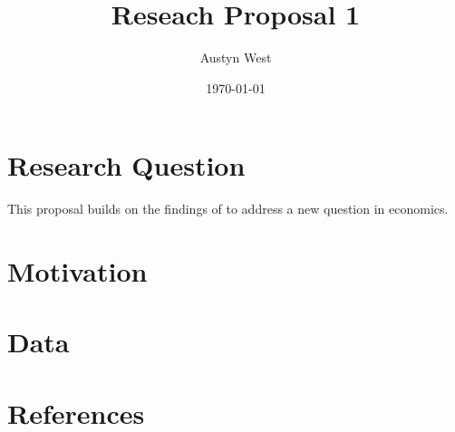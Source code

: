 \documentclass[12pt]{article}
\title{Reseach Proposal 1}
\author{Austyn West}
\date{\today}
\begin{document}
\maketitle


\section*{Research Question}
This proposal builds on the findings of \cite{example2020} to address a new question in economics.

\section*{Motivation}

\section*{Data}


\section*{References}
\printbibliography
\end{document}

